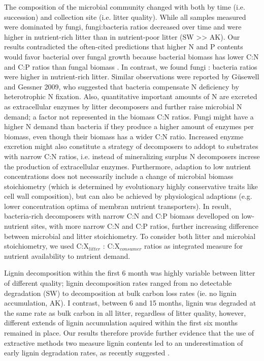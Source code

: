 The composition of the microbial community changed with both by time (i.e. succession) and collection site (i.e. litter quality). While all samples measured were dominated by fungi,  fungi:bacteria ratios decreased over time and were higher in nutrient-rich litter than in nutrient-poor litter (SW >> AK). Our results contradicted the often-cited predictions that higher N and P contents would favor bacterial over fungal growth because bacterial biomass has lower C:N and C:P ratios than fungal biomass \cite{Hodge2000}. In contrast, we found fungi : bacteria ratios were higher in nutrient-rich litter. Similar observations were reported by Güsewell and Gessner 2009, who suggested that bacteria compensate N deficiency by heterotrophic N fixation. Also, quantitative important amounts of N are excreted as extracellular enzymes by litter decomposers and further raise microbial N demand; a factor not represented in the biomass C:N ratios. Fungi might have a higher N demand than bacteria if they produce a higher amount of enzymes per biomass, even though their biomass has a wider C:N ratio. Increased enyzme excretion might also constitute a strategy of decomposers to addopt to substrates with narrow C:N ratios, i.e. instead of mineralizing surplus N decomposers increse the production of extracellular enzymes. Furthermore, adaption to low nutrient concentrations does not necessarily include a change of microbial biomass stoichiometry (which is determined by evolutionary highly conservative traits like cell wall composition), but can also be achieved by physiological adaptions (e.g. lower concentration optima of membran nutrient transporters). In result, bacteria-rich decomposers with narrow C:N and C:P biomass develloped on low-nutrient sites, with more narrow C:N and C:P ratios, further increasing difference between microbial and litter stoichiometry. To consider both litter and microbial stoichiometry, we used C:X$_{litter}$ : C:X$_{consumer}$ ratios as integrated measure for nutrient availability to nutrient demand.

Lignin decomposition within the first 6 month was highly variable between litter of different quality; lignin decomposition rates ranged from no detectable degradation (SW) to decomposition at bulk carbon loss rates (ie. no lignin accumulation, AK). I contrast, between 6 and 15 months, lignin was degraded at the same rate as bulk carbon in all litter, regardless of litter quality, however, different extends of lignin accumulation aquired within the first six months remained in place. Our results therefore provide further evidence that the use of extractive methods two measure lignin contents led to an underestimation of early lignin degradation rates, as recently suggested \cite{Klotzbucher2011}. 

